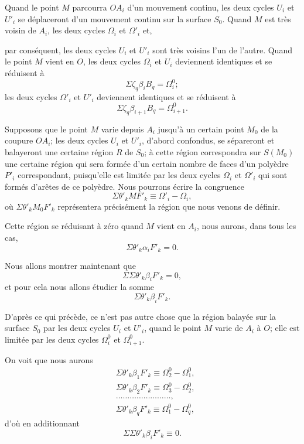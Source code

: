 \documentclass{article}
\begin{document}
Quand le point $M$ parcourra $OA_{i}$ d'un mouvement continu, les deux cycles $U_{i}$ et $U'_{i}$ se déplaceront d'un mouvement continu sur la surface $S_{0}$. Quand $M$ est très voisin de $A_{i}$, les deux cycles $\Omega_{i}$ et $\Omega'_{i}$ et,

par conséquent, les deux cycles $U_{i}$ et $U'_{i}$ sont très voisins l'un de l'autre. Quand le point $M$ vient en $O$, les deux cycles $\Omega_{i}$ et $U_{i}$ deviennent identiques et se réduisent à
\[ \Sigma \zeta_{q} \beta_{i}B_{q} = \Omega^{0}_{i}; \]
les deux cycles $\Omega'_{i}$ et $U'_{i}$ deviennent identiques et se réduisent à
\[ \Sigma \zeta_{q} \beta_{i+1}B_{q} = \Omega^{0}_{i+1}. \]

Supposons que le point $M$ varie depuis $A_{i}$ jusqu'à un certain point $M_{0}$ de la coupure $OA_{i}$; les deux cycles $U_{i}$ et $U'_{i}$, d'abord confondus, se sépareront et balayeront une certaine région $R$ de $S_{0}$; à cette région correspondra sur $S(M_{0})$ une certaine région qui sera formée d'un certain nombre de faces d'un polyèdre $P'_{i}$ correspondant, puisqu'elle est limitée par les deux cycles $\Omega_{i}$ et $\Omega'_{i}$ qui sont formés d'arêtes de ce polyèdre. Nous pourrons écrire la congruence
\[ \Sigma \theta'_{k} MF'_{k} \equiv \Omega'_{i} - \Omega_{i}, \tag{5} \]
où $\Sigma \theta'_{k} M_{0}F'_{k}$ représentera précisément la région que nous venons de définir.

Cette région se réduisant à zéro quand $M$ vient en $A_{i}$, nous aurons, dans tous les cas,
\[ \Sigma \theta'_{k} \alpha_{i}F'_{k} = 0. \tag{8} \]

Nous allons montrer maintenant que
\[ \Sigma \Sigma \theta'_{k} \beta_{i}F'_{k} = 0, \]
et pour cela nous allons étudier la somme
\[ \Sigma \theta'_{k} \beta_{i}F'_{k}. \]

D'après ce qui précède, ce n'est pas autre chose que la région balayée sur la surface $S_{0}$ par les deux cycles $U_{i}$ et $U'_{i}$, quand le point $M$ varie de $A_{i}$ à $O$; elle est limitée par les deux cycles $\Omega^{0}_{i}$ et $\Omega^{0}_{i+1}$.


On voit que nous aurons
\[ \begin{aligned} &\Sigma \theta'_{k} \beta_{1}F'_{k} \equiv \Omega^{0}_{2} - \Omega^{0}_{1},\\ &\Sigma \theta'_{k} \beta_{2}F'_{k} \equiv \Omega^{0}_{3} - \Omega^{0}_{2},\\ &\ldots\ldots\ldots\ldots\ldots\ldots\ldots\ldots,\\ &\Sigma \theta'_{k} \beta_{q}F'_{k} \equiv \Omega^{0}_{1} - \Omega^{0}_{q}, \end{aligned} \]
d'où en additionnant
\[ \Sigma \Sigma \theta'_{k} \beta_{i}F'_{k} \equiv 0. \]
\end{document}

